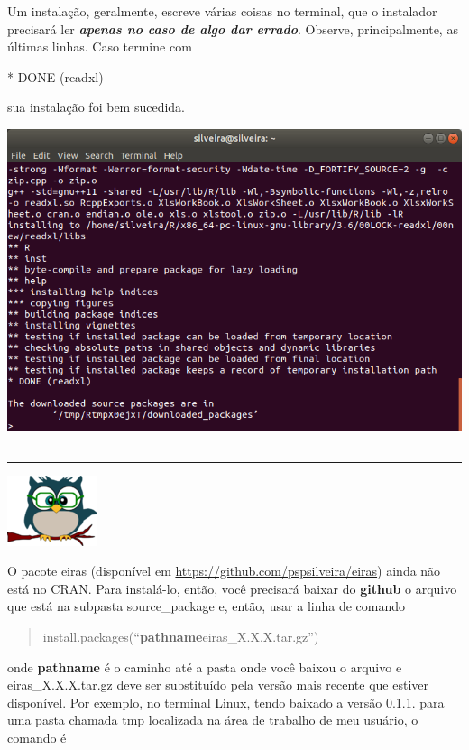 \documentclass[
]{article}
\begin{document}
Um instalação, geralmente, escreve várias coisas no terminal, que o
instalador precisará ler \emph{\textbf{apenas no caso de algo dar
errado}}. Observe, principalmente, as últimas linhas. Caso termine com

{* DONE (readxl)}

sua instalação foi bem sucedida.

\begin{center}\includegraphics[width=0.9\linewidth]{R_installpackage2} \end{center}

\begin{center}\rule{0.5\linewidth}{0.5pt}\end{center}

\begin{center}\rule{0.5\linewidth}{0.5pt}\end{center}

\begin{flushleft}\includegraphics[width=0.08\linewidth]{coruja} \end{flushleft}

O pacote eiras (disponível em
\url{https://github.com/pspsilveira/eiras}) ainda não está no CRAN. Para
instalá-lo, então, você precisará baixar do \textbf{github} o arquivo
que está na subpasta source\_package e, então, usar a linha de comando

\begin{quote}
install.packages(``\textbf{pathname}eiras\_X.X.X.tar.gz'')
\end{quote}

onde \textbf{pathname} é o caminho até a pasta onde você baixou o
arquivo e eiras\_X.X.X.tar.gz deve ser substituído pela versão mais
recente que estiver disponível. Por exemplo, no terminal Linux, tendo
baixado a versão 0.1.1. para uma pasta chamada tmp localizada na área de
trabalho de meu usuário, o comando é
\end{document}
